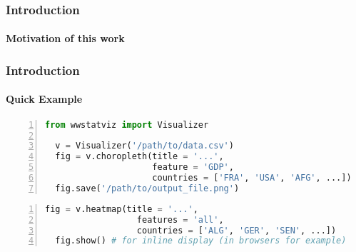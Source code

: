 \begin{frame}
  \frametitle{Introduction}
  \framesubtitle{Motivation of this work}


\end{frame}

\begin{frame}[fragile,shrink=30]
  \frametitle{Introduction}
  \framesubtitle{Quick Example}
 
  \begin{lstlisting}[language=Python,numbers=left]
  from wwstatviz import Visualizer

  v = Visualizer('/path/to/data.csv')
  fig = v.choropleth(title = '...', 
                     feature = 'GDP',
                     countries = ['FRA', 'USA', 'AFG', ...])
  fig.save('/path/to/output_file.png')
  \end{lstlisting}

  \begin{lstlisting}[language=Python,numbers=left]
  fig = v.heatmap(title = '...',
                  features = 'all',
                  countries = ['ALG', 'GER', 'SEN', ...])
  fig.show() # for inline display (in browsers for example)
  \end{lstlisting}
\end{frame}
